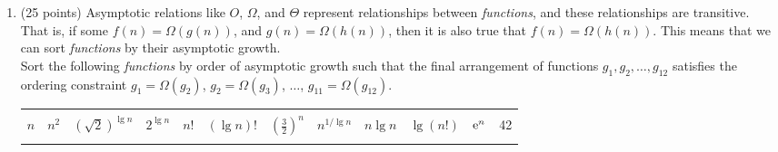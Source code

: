 \documentclass[12pt]{article}
\begin{document}
\begin{enumerate}
		\item (25 points) Asymptotic relations like $O$, $\Omega$, and $\Theta$ represent relationships 
		between \textit{functions}, and these relationships are transitive. That is, if some $f(n)=\Omega(g(n))$, and $g(n)=\Omega(h(n))$, 
		then it is also true that $f(n)=\Omega(h(n))$. This means that we can sort \textit{functions} by their asymptotic growth.\\
		Sort the following {\em functions} by order of asymptotic growth such that the final arrangement of 
		functions $g_{1},g_{2},\dots,g_{12}$ satisfies the ordering constraint $g_{1}=\Omega(g_{2})$, $g_{2}=\Omega(g_{3})$, $\dots$, $g_{11}=\Omega(g_{12})$.\\
		\begin{center}
		\begin{tabular}{|c|c|c|c|c|c|c|c|c|c|c|c|} %
		\hline
		& & & & & & & & & & & \\
		$n$ & $n^{2}$  & $(\sqrt{2})^{\lg n}$ & $2^{\lg n}$ & $n!$ & $(\lg n)!$ & $\left(\frac{3}{2}\right)^{n}$ & $n^{1/\lg n}$ & $n \lg n$ & $\lg(n!)$ & ${\rm e}^{n}$ & 42 \\
		& & & & & & & & & & & \\
		\hline
		\end{tabular}
		\end{center}


\end{enumerate}
\end{document}
